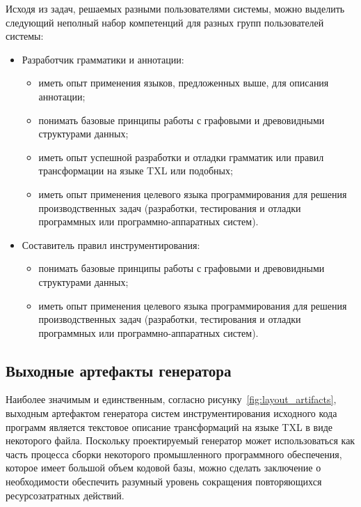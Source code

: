 Исходя из задач, решаемых разными пользователями системы, можно выделить следующий неполный набор компетенций для разных групп пользователей системы:

\begin{itemize}[noitemsep]
  \item Разработчик грамматики и аннотации:
    \begin{itemize}[noitemsep]
      \item иметь опыт применения языков, предложенных выше, для описания аннотации;
      \item понимать базовые принципы работы с графовыми и древовидными структурами данных;
      \item иметь опыт успешной разработки и отладки грамматик или правил трансформации на языке TXL или подобных;
      \item иметь опыт применения целевого языка программирования для решения производственных задач (разработки, тестирования и отладки программных или программно-аппаратных систем).
    \end{itemize}

  \item Составитель правил инструментирования:
    \begin{itemize}[noitemsep]
      \item понимать базовые принципы работы с графовыми и древовидными структурами данных;
      \item иметь опыт применения целевого языка программирования для решения производственных задач (разработки, тестирования и отладки программных или программно-аппаратных систем).
    \end{itemize}
\end{itemize}

\subsection{Выходные артефакты генератора}

Наиболее значимым и единственным, согласно рисунку~\ref{fig:layout_artifacts}, выходным артефактом генератора систем инструментирования исходного кода программ является текстовое описание трансформаций на языке TXL в виде некоторого файла.
Поскольку проектируемый генератор может использоваться как часть процесса сборки некоторого промышленного программного обеспечения, которое имеет большой объем кодовой базы, можно сделать заключение о необходимости обеспечить разумный уровень сокращения повторяющихся ресурсозатратных действий.

